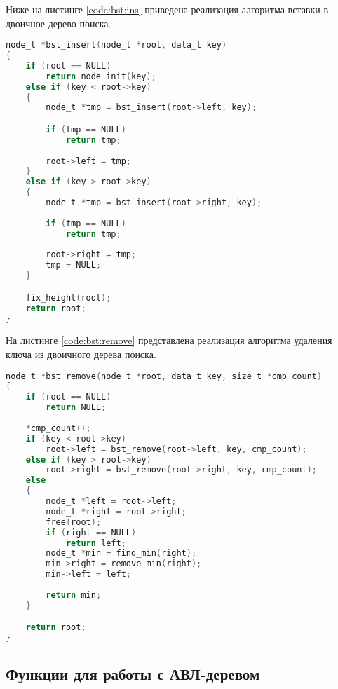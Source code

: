Ниже на листинге \ref{code:bst:ins} приведена реализация алгоритма вставки в двоичное дерево поиска.

\begin{lstlisting}[language=C,caption=Реализация алгоритма вставки в двоичное дерево поиска,label=code:bst:ins]
node_t *bst_insert(node_t *root, data_t key)
{
    if (root == NULL)
        return node_init(key);
    else if (key < root->key)
    {
        node_t *tmp = bst_insert(root->left, key);

        if (tmp == NULL)
            return tmp;
        
        root->left = tmp;
    }
    else if (key > root->key)
    {
        node_t *tmp = bst_insert(root->right, key);        
    
        if (tmp == NULL)
            return tmp;
        
        root->right = tmp;
        tmp = NULL;
    }

    fix_height(root);
    return root;
}
\end{lstlisting}

\clearpage

На листинге \ref{code:bst:remove} представлена реализация алгоритма удаления ключа из двоичного дерева поиска.

\begin{lstlisting}[language=C,caption=Реализация алгоритма удаления ключа из двоичного дерева поиска,label=code:bst:remove]
node_t *bst_remove(node_t *root, data_t key, size_t *cmp_count)
{
    if (root == NULL)
        return NULL;
    
    *cmp_count++;
    if (key < root->key)
        root->left = bst_remove(root->left, key, cmp_count);
    else if (key > root->key)
        root->right = bst_remove(root->right, key, cmp_count);
    else
    {
        node_t *left = root->left;
        node_t *right = root->right;
        free(root);
        if (right == NULL)
            return left;
        node_t *min = find_min(right);
        min->right = remove_min(right);
        min->left = left;
        
        return min;
    }

    return root;
}
\end{lstlisting}

\clearpage

\subsection{Функции для работы с АВЛ-деревом}

